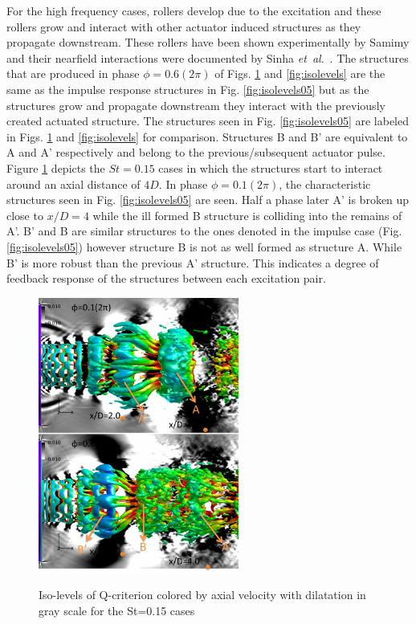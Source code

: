\documentclass[english]{aiaa-tc}
\newcommand*{\etal}{\textit{et~al}.\ }
\begin{document}
For the high frequency cases, rollers develop due to the excitation and these rollers grow and interact with other actuator induced structures as they propagate downstream. These rollers have been shown experimentally by Samimy \cite{sm2007} and their nearfield interactions were documented by Sinha \etal \cite{sinha2013}.
The structures that are produced in phase $\phi=0.6(2\pi)$ of Figs. \ref{fig:isolevels15} and \ref{fig:isolevels} are the same as the impulse response structures in Fig. \ref{fig:isolevels05} but as the structures grow and propagate downstream they interact with the previously created actuated structure. The structures seen in Fig. \ref{fig:isolevels05} are labeled in Figs. \ref{fig:isolevels15} and \ref{fig:isolevels} for comparison. Structures B and B' are equivalent to A and A' respectively and belong to the previous/subsequent actuator pulse.
Figure \ref{fig:isolevels15} depicts the $St=0.15$ cases in which the structures start to interact around an axial distance of $4D$. In phase $\phi=0.1(2\pi)$, the characteristic structures seen in Fig. \ref{fig:isolevels05} are seen. Half a phase later A' is broken up close to $x/D=4$ while the ill formed B structure is colliding into the remains of A'. B' and B are similar structures to the ones denoted in the impulse case (Fig. \ref{fig:isolevels05}) however structure B is not as well formed as structure A. While B' is more robust than the previous A' structure. This indicates a degree of feedback response of the structures between each excitation pair. %
\begin{figure}
\begin{center}
\begin{centering}
{\includegraphics[width=2.6in]{M09St015qcritphase0106AB}}
\end{centering}
\caption{Iso-levels of Q-criterion colored by axial velocity with dilatation in gray scale for the St=0.15 cases}
\label{fig:isolevels15}
\end{center}
\end{figure}
\end{document}
